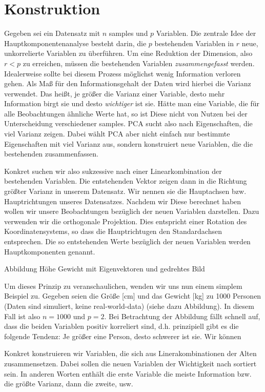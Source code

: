 \section{Konstruktion}

Gegeben sei ein Datensatz mit $n$ samples und $p$ Variablen. Die zentrale Idee der Hauptkomponentenanalyse besteht darin, die $p$ bestehenden Variablen in $r$ neue, unkorrelierte Variablen zu überführen. Um eine Reduktion der Dimension, also $r < p$ zu erreichen, müssen die bestehenden Variablen \textit{zusammengefasst} werden. Idealerweise sollte bei diesem Prozess möglichst wenig Information verloren gehen. Als Maß für den Informationsgehalt der Daten wird hierbei die Varianz verwendet. Das heißt, je größer die Varianz einer Variable, desto mehr Information birgt sie und desto \textit{wichtiger} ist sie. Hätte man eine Variable, die für alle Beobachtungen ähnliche Werte hat, so ist Diese nicht von Nutzen bei der Unterscheidung verschiedener samples. PCA sucht also nach Eigenschaften, die viel Varianz zeigen. Dabei wählt PCA aber nicht einfach nur bestimmte Eigenschaften mit viel Varianz aus, sondern konstruiert neue Variablen, die die bestehenden zusammenfassen.

Konkret suchen wir also sukzessive nach einer Linearkombination der bestehenden Variablen. Die entstehenden Vektor zeigen dann in die Richtung größter Varianz in unserem Datensatz. Wir nennen sie die Hauptachsen bzw. Hauptrichtungen unseres Datensatzes. Nachdem wir Diese berechnet haben wollen wir unsere Beobachtungen bezüglich der neuen Variablen darstellen. Dazu verwenden wir die orthogonale Projektion. Dies entspricht einer Rotation des Koordinatensystems, so dass die Hauptrichtugen den Standardachsen entsprechen. Die so entstehenden Werte bezüglich der neuen Variablen werden Hauptkomponenten genannt. 

Abbildung Höhe Gewicht mit Eigenvektoren und gedrehtes Bild

Um dieses Prinzip zu veranschaulichen, wenden wir uns nun einem simplem Beispiel zu. Gegeben seien die Größe [cm] und das Gewicht [kg] zu 1000 Personen (Daten sind simuliert, keine real-world-data) (siehe dazu Abbildung). In diesem Fall ist also $n = 1000$ und $p = 2$. Bei Betrachtung der Abbildung fällt schnell auf, dass die beiden Variablen positiv korreliert sind, d.h. prinzipiell gibt es die folgende Tendenz: Je größer eine Person, desto schwerer ist sie. Wir können

Konkret konstruieren wir Variablen, die sich aus Linerakombinationen der Alten zusammensetzen. Dabei sollen die neuen Variablen der Wichtigkeit nach sortiert sein. In anderen Worten enthält die erste Variable die meiste Information bzw. die größte Varianz, dann die zweite, usw.

